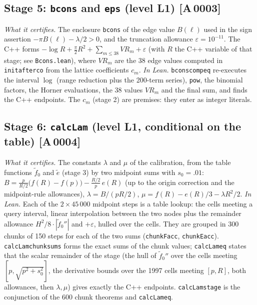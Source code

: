 \documentclass[10pt]{article}
\newcommand{\tg}[2]{\texorpdfstring{\textsf{[#1\,#2]}}{}}  %
\newcommand{\lean}[1]{\texttt{#1}}
\renewcommand{\_}{\textunderscore\allowbreak}
\begin{document}
\subsection{Stage 5: \lean{bcons} and \lean{eps} (level L1) \tg{A}{0003}}
\emph{What it certifies.} The enclosure \lean{bcons} of the edge value $B(\ell)$ used in the sign assertion $-\pi B(\ell)-\lambda/2>0$, and the truncation allowance $\varepsilon=10^{-11}$. The C++ forms $-\log R+\tfrac\pi2R^2+\sum_{m\le38}VR_m+\varepsilon$ (with $R$ the C++ variable of that stage; see \texttt{Bcons.lean}), where $VR_m$ are the 38 edge values computed in \lean{init\_after\_co} from the lattice coefficients $c_m$.
\emph{In Lean.} \lean{bcons\_comp\_eq} re-executes the interval $\log$ (range reduction plus the 200-term series), \lean{pow}, the binomial factors, the Horner evaluations, the 38 values $VR_m$ and the final sum, and finds the C++ endpoints. The $c_m$ (stage 2) are premises: they enter as integer literals.

\subsection{Stage 6: \lean{calcLam} (level L1, conditional on the table) \tg{A}{0004}}
\emph{What it certifies.} The constants $\lambda$ and $\mu$ of the calibration, from the table functions $\tilde f_0$ and $\tilde e$ (stage 3) by two midpoint sums with $s_0=.01$:
$B=\frac{p}{R/2}\bigl(f(R)-f(p)\bigr)-\frac{R/2}{p}\,e(R)$ (up to the origin correction and the midpoint-rule allowances), $\lambda=B/(pR/2)$, $\mu=f(R)-e(R)/3-\lambda R^2/2$.
\emph{In Lean.} Each of the $2\times45\,000$ midpoint steps is a table lookup: the cells meeting a query interval, linear interpolation between the two nodes plus the remainder allowance $H^2/8\cdot|\tilde f_0''|$ and $+\varepsilon$, hulled over the cells. They are grouped in 300 chunks of 150 steps for each of the two sums (\lean{chunkFacc}, \lean{chunkEacc}). \lean{calcLam\_chunk\_sums} forms the exact sums of the chunk values; \lean{calcLam\_eq} states that the scalar remainder of the stage (the hull of $\tilde f_0''$ over the cells meeting $[p,\sqrt{p^2+s_0^2}]$, the derivative bounds over the 1997 cells meeting $[p,R]$, both allowances, then $\lambda,\mu$) gives exactly the C++ endpoints. \lean{calcLam\_stage} is the conjunction of the 600 chunk theorems and \lean{calcLam\_eq}.
\end{document}
